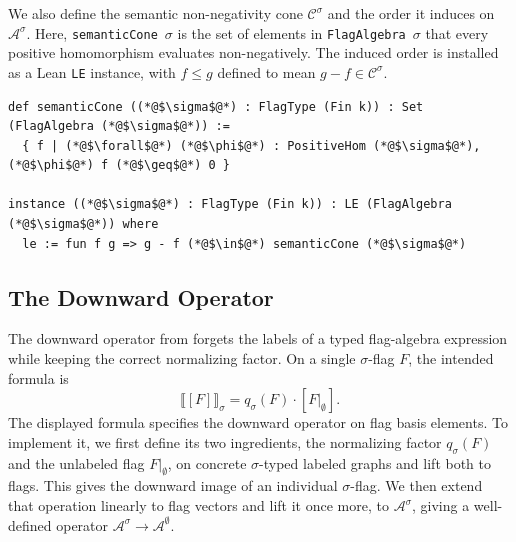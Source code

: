 \documentclass[acmsmall,screen=true,acmthm=false]{acmart}
\DeclareRobustCommand{\lean}[1]{{\def\_{\textunderscore\allowbreak}\texttt{#1}}}
\begin{document}
We also define the semantic non-negativity cone $\mathcal{C}^\sigma$
and the order it induces on $\mathcal{A}^\sigma$.
Here, 
\lean{semanticCone}~$\sigma$ is the set of elements in
\lean{FlagAlgebra}~$\sigma$ that every positive homomorphism
evaluates non-negatively.  The induced order is installed as a Lean
\lean{LE} instance, with $f \leq g$ defined to mean
$g - f \in \mathcal{C}^\sigma$.
\begin{lstlisting}
def semanticCone ((*@$\sigma$@*) : FlagType (Fin k)) : Set (FlagAlgebra (*@$\sigma$@*)) :=
  { f | (*@$\forall$@*) (*@$\phi$@*) : PositiveHom (*@$\sigma$@*), (*@$\phi$@*) f (*@$\geq$@*) 0 }

instance ((*@$\sigma$@*) : FlagType (Fin k)) : LE (FlagAlgebra (*@$\sigma$@*)) where
  le := fun f g => g - f (*@$\in$@*) semanticCone (*@$\sigma$@*)
\end{lstlisting}

\subsection{The Downward Operator}
\label{sec:formal-downward}

The downward operator from  forgets the
labels of a typed flag-algebra expression while keeping the correct
normalizing factor.  On a single $\sigma$-flag $F$, the intended formula is
\[
  \llbracket [F] \rrbracket_\sigma = q_\sigma(F)\cdot [F|_\emptyset].
\]
The displayed formula specifies the downward operator on flag basis elements.
To implement it, we first define its two ingredients, the normalizing factor
$q_\sigma(F)$ and the unlabeled flag $F|_\emptyset$, on concrete
$\sigma$-typed labeled graphs and lift both to flags.  This gives the downward
image of an individual $\sigma$-flag.  We then extend that operation linearly
to flag vectors and lift it once more, to $\mathcal{A}^\sigma$, giving a
well-defined operator
\(\mathcal{A}^\sigma\longrightarrow\mathcal{A}^\emptyset\).
\end{document}
